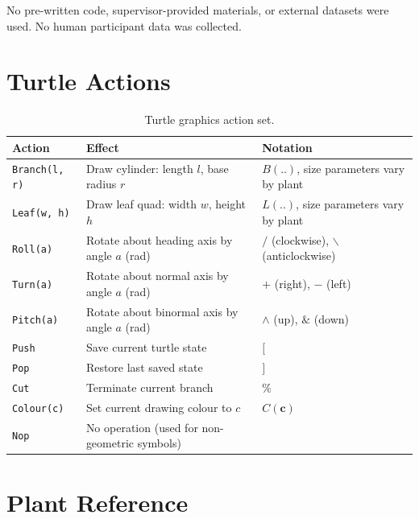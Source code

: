 \begin{appendices}
No pre-written code, supervisor-provided materials, or external datasets were used. No human participant data
was collected.

\chapter{Turtle Actions}
\label{app:turtle}

\begin{table}[h]
  \centering
  \begin{tabular}{|l|l|l|}
    \hline
    \textbf{Action}       & \textbf{Effect}                               & \textbf{Notation} \\
    \hline
    \texttt{Branch(l, r)} & Draw cylinder: length $l$, base radius $r$    & $B(..)$, size parameters vary by plant \\
    \texttt{Leaf(w, h)}   & Draw leaf quad: width $w$, height $h$         & $L(..)$, size parameters vary by plant \\
    \texttt{Roll(a)}      & Rotate about heading axis by angle $a$ (rad)  & $/$ (clockwise), $\backslash$
    (anticlockwise) \\
    \texttt{Turn(a)}      & Rotate about normal axis by angle $a$ (rad)   & $+$ (right), $-$ (left) \\
    \texttt{Pitch(a)}     & Rotate about binormal axis by angle $a$ (rad) & $\wedge$ (up), $\mathbin{\&}$ (down) \\
    \texttt{Push}         & Save current turtle state                     & $[$ \\
    \texttt{Pop}          & Restore last saved state                      & $]$ \\
    \texttt{Cut}          & Terminate current branch                      & $\%$ \\
    \texttt{Colour(c)}    & Set current drawing colour to $c$             & $C(\mathbf{c})$ \\
    \texttt{Nop}          & No operation (used for non-geometric symbols) & \\
    \hline
  \end{tabular}
  \caption{Turtle graphics action set.}
  \label{tab:actions}
\end{table}

\chapter{Plant Reference}
\label{app:plants}


\end{appendices}
